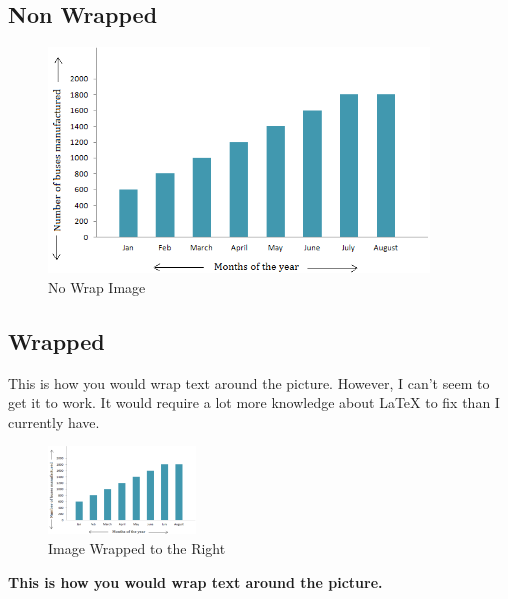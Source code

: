 \documentclass{article}
\begin{document}
    \subsection{Non Wrapped}
    \lipsum[1-1]
    \begin{figure}[h]
        \centering
        \includegraphics[width=0.90\textwidth]{bar-graph}
        \caption{No Wrap Image}
    \end{figure}
    \subsection{Wrapped}

    This is how you would wrap text around the picture.
    However, I can't seem to get it to work. It would require
    a lot more knowledge about {\LaTeX} to fix than I 
    currently have.
    \lipsum[1-1]

    \begin{figure}
        \centering
        \includegraphics[width=0.35\textwidth]{bar-graph}
      \caption{Image Wrapped to the Right}
    \end{figure}

    \textbf{This is how you would wrap text around the picture.}
\end{document}
